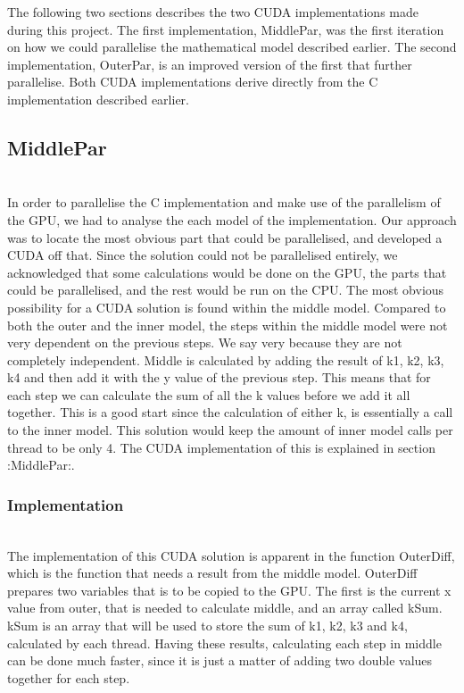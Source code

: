 The following two sections describes the two CUDA implementations made during this project. The first implementation, MiddlePar, was the first iteration on how we could parallelise the mathematical model described earlier. The second implementation, OuterPar, is an improved version of the first that further parallelise. Both CUDA implementations derive directly from the C implementation described earlier.

\subsection{MiddlePar} \hfill \\
In order to parallelise the C implementation and make use of the parallelism of the GPU, we had to analyse the each model of the implementation. Our approach was to locate the most obvious part that could be parallelised, and developed a CUDA off that. Since the solution could not be parallelised entirely, we acknowledged that some calculations would be done on the GPU, the parts that could be parallelised, and the rest would be run on the CPU. The most obvious possibility for a CUDA solution is found within the middle model. Compared to both the outer and the inner model, the steps within the middle model were not very dependent on the previous steps. We say very because they are not completely independent. Middle is calculated by adding the result of k1, k2, k3, k4 and then add it with the y value of the previous step. This means that for each step we can calculate the sum of all the k values before we add it all together. This is a good start since the calculation of either k, is essentially a call to the inner model. This solution would keep the amount of inner model calls per thread to be only 4. The CUDA implementation of this is explained in section :MiddlePar:.

\subsubsection{Implementation} \hfill \\
The implementation of this CUDA solution is apparent in the function OuterDiff, which is the function that needs a result from the middle model. OuterDiff prepares two variables that is to be copied to the GPU. The first is the current x value from outer, that is needed to calculate middle, and an array called kSum. kSum is an array that will be used to store the sum of k1, k2, k3 and k4, calculated by each thread. Having these results, calculating each step in middle can be done much faster, since it is just a matter of adding two double values together for each step. 

